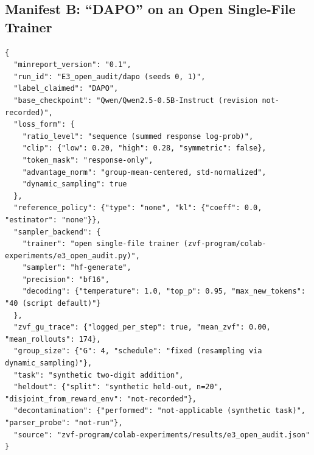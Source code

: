 \subsection{Manifest B: ``DAPO'' on an Open Single-File Trainer}
\label{app:p5-manifest-b}
\begin{lstlisting}[basicstyle=\ttfamily\footnotesize, frame=single,
                   breaklines=true, columns=fullflexible]
{
  "minreport_version": "0.1",
  "run_id": "E3_open_audit/dapo (seeds 0, 1)",
  "label_claimed": "DAPO",
  "base_checkpoint": "Qwen/Qwen2.5-0.5B-Instruct (revision not-recorded)",
  "loss_form": {
    "ratio_level": "sequence (summed response log-prob)",
    "clip": {"low": 0.20, "high": 0.28, "symmetric": false},
    "token_mask": "response-only",
    "advantage_norm": "group-mean-centered, std-normalized",
    "dynamic_sampling": true
  },
  "reference_policy": {"type": "none", "kl": {"coeff": 0.0, "estimator": "none"}},
  "sampler_backend": {
    "trainer": "open single-file trainer (zvf-program/colab-experiments/e3_open_audit.py)",
    "sampler": "hf-generate",
    "precision": "bf16",
    "decoding": {"temperature": 1.0, "top_p": 0.95, "max_new_tokens": "40 (script default)"}
  },
  "zvf_gu_trace": {"logged_per_step": true, "mean_zvf": 0.00, "mean_rollouts": 174},
  "group_size": {"G": 4, "schedule": "fixed (resampling via dynamic_sampling)"},
  "task": "synthetic two-digit addition",
  "heldout": {"split": "synthetic held-out, n=20", "disjoint_from_reward_env": "not-recorded"},
  "decontamination": {"performed": "not-applicable (synthetic task)", "parser_probe": "not-run"},
  "source": "zvf-program/colab-experiments/results/e3_open_audit.json"
}
\end{lstlisting}

